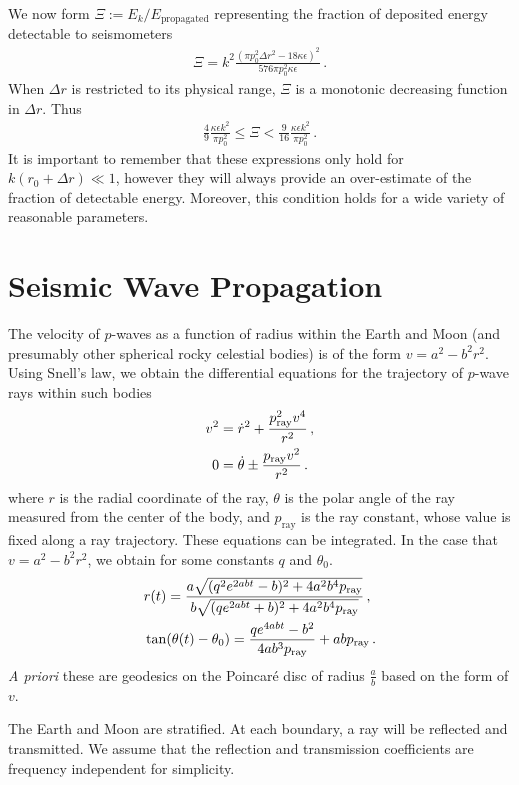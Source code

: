 \documentclass[prd,reprint,10pt,tightenlines]{revtex4-1}
\newcommand*\te[1]{\text{#1}}
\newcommand*\p[1]{\left(#1\right)}
\newcommand*\f[2]{\frac{#1}{#2}}
\begin{document}
We now form $\Xi:=E_k/E_\te{propagated}$ representing the fraction of deposited energy detectable to seismometers
\begin{align}
\Xi = k^2\f{\p{\pi p_0^2\Delta r^2-18\kappa \epsilon}^2}{576 \pi p_0^2 \kappa \epsilon}\,.
\end{align}
When $\Delta r$ is restricted to its physical range, $\Xi$ is a monotonic decreasing function in $\Delta r$. Thus
\begin{align}
\f{4}{9}\f{\kappa\epsilon k^2}{\pi  p_0^2} \leq \Xi <\f{9}{16}\f{\kappa\epsilon k^2}{\pi  p_0^2}\,.
\end{align}
It is important to remember that these expressions only hold for $k(r_0+\Delta r)\ll 1$, however they will always provide an over-estimate of the fraction of detectable energy. Moreover, this condition holds for a wide variety of reasonable parameters.

\section{Seismic Wave Propagation}
The velocity of $p$-waves as a function of radius within the Earth and Moon (and presumably other spherical rocky celestial bodies) is of the form $v = a^2 - b^2 r^2$. Using Snell's law, we obtain the differential equations for the trajectory of $p$-wave rays within such bodies
\begin{align}
v^2 \notag&= \dot r^2 + \f{p_\te{ray}^2 v^4}{r^2}\,,\\
0 &=\dot\theta\pm\f{p_\te{ray} v^2}{r^2}\,.
\end{align}
where $r$ is the radial coordinate of the ray, $\theta$ is the polar angle of the ray measured from the center of the body, and $p_\te{ray}$ is the ray constant, whose value is fixed along a ray trajectory. These equations can be integrated. In the case that $v = a^2 - b^2 r^2$, we obtain for some constants $q$ and $\theta_0$.
\begin{align}
\notag&r(t) = \f{a\sqrt{(q^2e^{2abt}-b)^2 + 4a^2b^4 p_\te{ray}}}{b\sqrt{(qe^{2abt}+b)^2 + 4a^2b^4 p_\te{ray}}}\,,\\
&\tan(\theta(t) - \theta_0) = \f{qe^{4abt}-b^2}{4ab^3p_\te{ray}}+abp_\te{ray}\,.
\end{align}
\textit{A priori} these are geodesics on the Poincar\'e disc of radius $\f ab$ based on the form of $v$. 

The Earth and Moon are stratified. At each boundary, a ray will be reflected and transmitted. We assume that the reflection and transmission coefficients are frequency independent for simplicity. 
\end{document}
